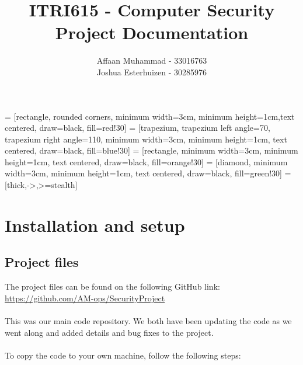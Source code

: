 \documentclass[a4paper, 12pt, titlepage]{report}
\begin{document}
 = [rectangle, rounded corners, minimum width=3cm, minimum height=1cm,text centered, draw=black, fill=red!30]
 = [trapezium, trapezium left angle=70, trapezium right angle=110, minimum width=3cm, minimum height=1cm, text centered, draw=black, fill=blue!30]
 = [rectangle, minimum width=3cm, minimum height=1cm, text centered, draw=black, fill=orange!30]
 = [diamond, minimum width=3cm, minimum height=1cm, text centered, draw=black, fill=green!30]
 = [thick,->,>=stealth]
\linespread{1.25}
\author{Affaan Muhammad - 33016763\\Joshua Esterhuizen - 30285976}
\title{ITRI615 - Computer Security\\Project Documentation}
\date{}
\maketitle
\tableofcontents{}

\chapter{Installation and setup}
\section{Project files}
The project files can be found on the following GitHub link:\\
\url{https://github.com/AM-ops/SecurityProject}
\\\\This was our main code repository. We both have been updating the code as we went along and added details and bug fixes to the project.\\\\
To copy the code to your own machine, follow the following steps:
\end{document}
